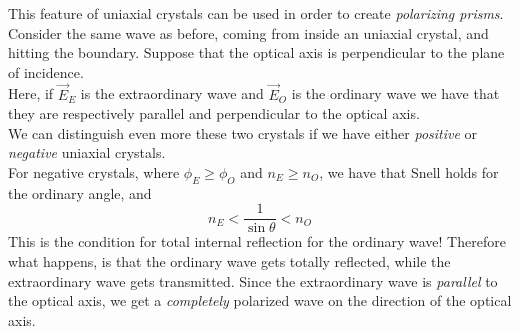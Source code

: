 \documentclass[../electromagnetism.tex]{subfiles}
\begin{document}
This feature of uniaxial crystals can be used in order to create \textit{polarizing prisms}. Consider the same wave as before, coming from inside an uniaxial crystal, and hitting the boundary. Suppose that the optical axis is perpendicular to the plane of incidence.\\
Here, if $\vec{E}_E$ is the extraordinary wave and $\vec{E}_O$ is the ordinary wave we have that they are respectively parallel and perpendicular to the optical axis.\\
We can distinguish even more these two crystals if we have either \textit{positive} or \textit{negative} uniaxial crystals.\\
For negative crystals, where $\phi_E\ge\phi_O$ and $n_E\ge n_O$, we have that Snell holds for the ordinary angle, and
\begin{equation}
	n_E<\frac{1}{\sin\theta}<n_O
	\label{eq:tire.bir}
\end{equation}
This is the condition for total internal reflection for the ordinary wave! Therefore what happens, is that the ordinary wave gets totally reflected, while the extraordinary wave gets transmitted. Since the extraordinary wave is \textit{parallel} to the optical axis, we get a \textit{completely} polarized wave on the direction of the optical axis.
\end{document}
